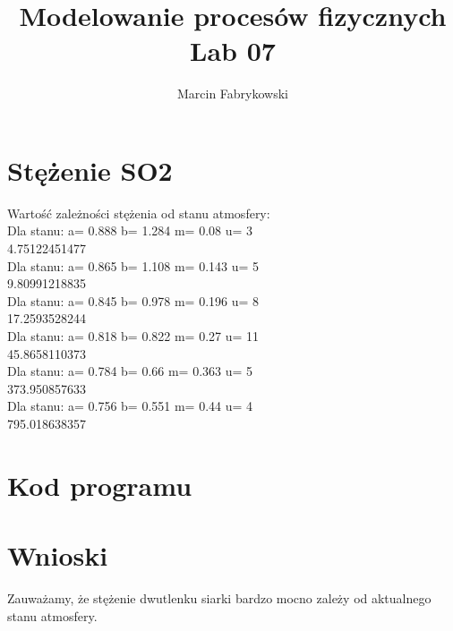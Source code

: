 \documentclass[a4paper,12pt]{article}
\author{Marcin Fabrykowski}
\title{Modelowanie procesów fizycznych\\Lab 07}
\begin{document}
\maketitle
\newpage
\section{Stężenie SO2}
Wartość zależności stężenia od stanu atmosfery:\\
Dla stanu: a= 0.888 b= 1.284  m= 0.08 u= 3\\
4.75122451477\\
Dla stanu: a= 0.865 b= 1.108  m= 0.143 u= 5\\
9.80991218835\\
Dla stanu: a= 0.845 b= 0.978  m= 0.196 u= 8\\
17.2593528244\\
Dla stanu: a= 0.818 b= 0.822  m= 0.27 u= 11\\
45.8658110373\\
Dla stanu: a= 0.784 b= 0.66  m= 0.363 u= 5\\
373.950857633\\
Dla stanu: a= 0.756 b= 0.551  m= 0.44 u= 4\\
795.018638357\\
\section{Kod programu}
\footnotesize

\normalsize
\section{Wnioski}
Zauważamy, że stężenie dwutlenku siarki bardzo mocno zależy od aktualnego stanu atmosfery.
\end{document}
